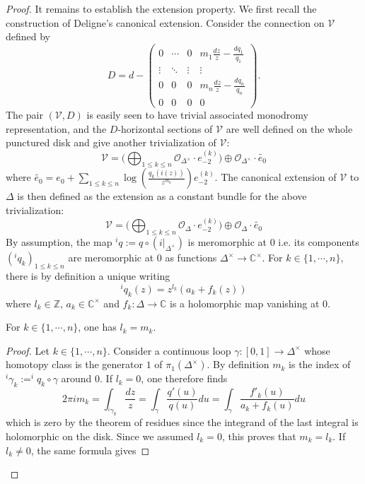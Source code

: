 \documentclass[10pt,a4paper]{amsart}
\newcommand{\C}{\mathbb C}
\newcommand{\Z}{\mathbb Z}
\begin{document}
\begin{proof}
It remains to establish the extension property. We first recall the construction of Deligne's canonical extension. Consider the connection on $\mathcal{V}$ defined by
\[
D = d - \left(\begin{array}{cccc}0  &  \cdots & 0 & m_1\frac{dz}{z} - \frac{d q_1}{q_1}  \\ \vdots & \ddots & \vdots & \vdots \\0 & 0 & 0 & m_n\frac{dz}{z} - \frac{d q_n}{q_n}  \\0 & 0 & 0 & 0\end{array}\right).
\]
The pair $(\mathcal{V}, D)$ is easily seen to have trivial associated monodromy representation, and the $D$-horizontal sections of $\mathcal{V}$ are well defined on the whole punctured disk and give another trivialization of $\mathcal{V}$:
\[
\mathcal{V} = \Big(\bigoplus_{1 \leqslant k \leqslant n} \mathcal{O}_{\Delta^\times} \cdot e_{-2}^{(k)} \Big) \oplus \mathcal{O}_{\Delta^\times} \cdot \tilde{e_0}
\]
where $\tilde{e_0} = e_0 + \sum_{1 \leqslant k \leqslant n} \log(\frac{q_k(i(z))}{z^{m_k}})e_{-2}^{(k)}$.
The canonical extension of $\mathcal{V}$ to $\Delta$ is then defined as the extension as a constant bundle for the above trivialization:
\[
\mathcal{V} = \Big(\bigoplus_{1 \leqslant k \leqslant n} \mathcal{O}_{\Delta} \cdot e_{-2}^{(k)} \Big) \oplus \mathcal{O}_{\Delta} \cdot \tilde{e_0}
\]
By assumption, the map $^iq := q \circ (i \vert_{\Delta^\times})$ is meromorphic at $0$ i.e. its components $(^iq_k)_{1 \leqslant k \leqslant n}$ are meromorphic at $0$ as functions $\Delta^\times \rightarrow \C^\times$. For $k \in \{1,\cdots, n\}$, there is by definition a unique writing
\[
^iq_k(z) = z^{l_k} (a_k + f_k(z))
\]
where $l_k \in \Z$, $a_k \in \C^\times$ and $f_k : \Delta \rightarrow \C$ is a holomorphic map vanishing at $0$.
\begin{lemma}\label{egal}
For $k \in \{1,\cdots, n\}$, one has $l_k = m_k$.
\end{lemma}
\begin{proof}
Let $k \in \{1,\cdots, n\}$. Consider a continuous loop $\gamma : [0,1] \rightarrow \Delta^\times$ whose homotopy class is the generator $1$ of $\pi_1(\Delta^\times)$. By definition $m_k$ is the index of $^i\gamma_k := ^iq_k \circ \gamma$ around $0$. If $l_k = 0$, one therefore finds
\[
2 \pi i m_k = \int_{^i\gamma_k} \frac{dz}{z} = \int_\gamma \frac{q'(u)}{q(u)}du = \int_\gamma \frac{f'_k(u)}{a_k + f_k(u)}du
\]
which is zero by the theorem of residues since the integrand of the last integral is holomorphic on the disk. Since we assumed $l_k = 0$, this proves that $m_k = l_k$. If $l_k \neq 0$, the same formula gives

\end{proof}
\end{proof}
\end{document}
